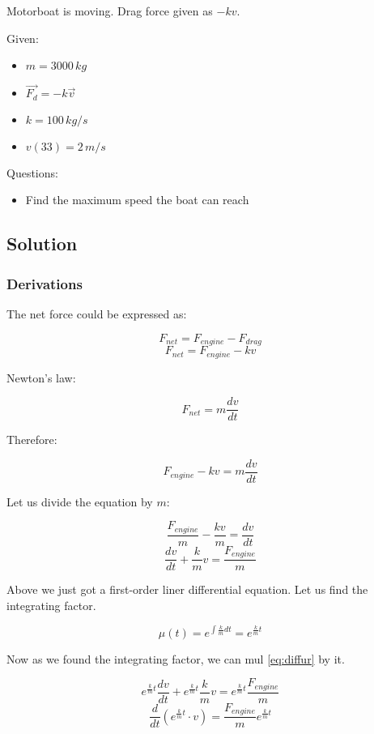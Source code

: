 
Motorboat is moving. Drag force given as $-kv$.

\bigbreak Given:
\begin{itemize}
    \item $ m = 3000\,kg $
    \item $ \vec{F_d} = -k\vec{v} $
    \item $ k = 100\,kg/s $
    \item $ v(33) = 2\,m/s $
\end{itemize}


\bigbreak Questions:
\begin{itemize}
    \item Find the maximum speed the boat can reach
\end{itemize}


\subsection*{Solution}
\subsubsection*{Derivations}

The net force could be expressed as:

$$ F_{net} = F_{engine} - F_{drag} $$
$$ F_{net} = F_{engine} - kv $$

Newton's law:

$$ F_{net} = m \frac{dv}{dt} $$

Therefore:

$$ F_{engine} - kv = m \frac{dv}{dt}  $$

\bigbreak Let us divide the equation by $m$:

$$ \frac{F_{engine}}{m} - \frac{kv}{m} = \frac{dv}{dt}  $$
\begin{equation}
    \label{eq:diffur}
    \frac{dv}{dt} + \frac{k}{m}v = \frac{F_{engine}}{m}
\end{equation}

\bigbreak Above we just got a first-order liner differential equation. Let us find the integrating factor.

$$ \mu(t) = e ^ {\int \frac{k}{m} dt} = e^{\frac{k}{m}t} $$ 

\bigbreak Now as we found the integrating factor, we can mul \ref{eq:diffur} by it.

$$ e^{\frac{k}{m}t} \frac{dv}{dt} + e^{\frac{k}{m}t} \frac{k}{m}v = e^{\frac{k}{m}t} \frac{F_{engine}}{m} $$
$$ \frac{d}{dt}(e^{\frac{k}{m}t} \cdot v) = \frac{F_{engine}}{m} e^{\frac{k}{m}t} $$

